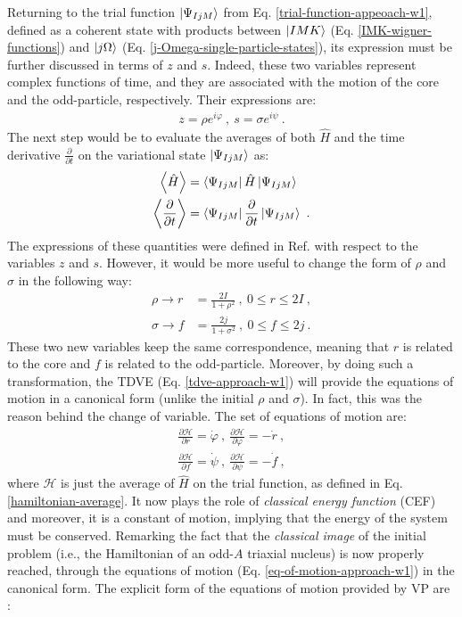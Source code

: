 Returning to the trial function $\ket{\Psi_{IjM}}$ from Eq. \ref{trial-function-appeoach-w1}, defined as a coherent state with products between  $\ket{IMK}$ (Eq. \ref{IMK-wigner-functions}) and $\ket{j\Omega}$ (Eq. \ref{j-Omega-single-particle-states}), its expression must be further discussed in terms of $z$ and $s$. Indeed, these two variables represent complex functions of time, and they are associated with the motion of the core and the odd-particle, respectively. Their expressions are:
\begin{align}
    z=\rho e^{i\varphi}\ ,\ s=\sigma e^{i\psi}\ .
\end{align}
The next step would be to evaluate the averages of both $\hat{H}$ and the time derivative $\frac{\partial}{\partial t}$ on the variational state $\ket{\Psi_{IjM}}$ as:
\begin{align}
    \left\langle \hat{H} \right\rangle&=\bra{\Psi_{IjM}}\hat{H}\ket{\Psi_{IjM}}\nonumber\\
    \left\langle \frac{\partial}{\partial t} \right\rangle&=\bra{\Psi_{IjM}}\frac{\partial}{\partial t}\ket{\Psi_{IjM}}\ .
    \label{hamiltonian-average}
\end{align}
The expressions of these quantities were defined in Ref. \cite{raduta2017semiclassical} with respect to the variables $z$ and $s$. However, it would be more useful to change the form of $\rho$ and $\sigma$ in the following way:
\begin{align}
    \rho \to r&=\frac{2I}{1+\rho^2}\ ,\ 0\leq r\leq 2I\ ,\nonumber\\
    \sigma \to f&=\frac{2j}{1+\sigma^2}\ ,\ 0\leq f\leq 2j\ .
    \label{changed-rho-sigma-variables}
\end{align}
These two new variables keep the same correspondence, meaning that $r$ is related to the core and $f$ is related to the odd-particle. Moreover, by doing such a transformation, the TDVE (Eq. \ref{tdve-approach-w1}) will provide the equations of motion in a canonical form (unlike the initial $\rho$ and $\sigma$). In fact, this was the reason behind the change of variable. The set of equations of motion are:
\begin{align}
    \frac{\partial \mathcal{H}}{\partial r}=\dot{\varphi}\ ,\ \frac{\partial \mathcal{H}}{\partial \varphi}=-\dot{r}\ ,\nonumber\\
    \frac{\partial \mathcal{H}}{\partial f}=\dot{\psi}\ ,\ \frac{\partial \mathcal{H}}{\partial \psi}=-\dot{f}\ ,
    \label{eq-of-motion-approach-w1}
\end{align}
where $\mathcal{H}$ is just the average of $\hat{H}$ on the trial function, as defined in Eq. \ref{hamiltonian-average}. It now plays the role of \emph{classical energy function} (CEF) and moreover, it is a constant of motion, implying that the energy of the system must be conserved. Remarking the fact that the \emph{classical image} of the initial problem (i.e., the Hamiltonian of an odd-$A$ triaxial nucleus) is now properly reached, through the equations of motion (Eq. \ref{eq-of-motion-approach-w1}) in the canonical form. The explicit form of the equations of motion provided by VP are \cite{raduta2020approach}:
